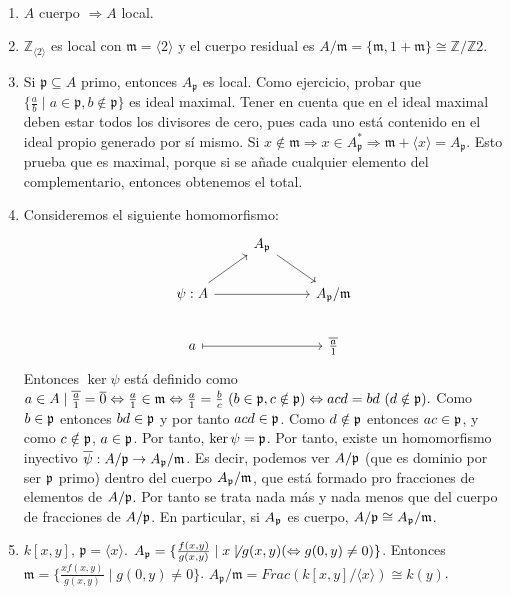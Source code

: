 \documentclass[ACGA.tex]{subfiles}
\begin{document}
\begin{ej}\
\begin{enumerate}
\item $A$ cuerpo $\Rightarrow A$ local. 
\item $\mathbb{Z}_{\langle 2\rangle}$ es local con $\mathfrak{m}=\langle 2\rangle$ y el cuerpo residual es $A/\mathfrak{m}=\{\mathfrak{m},1+\mathfrak{m}\}\cong\mathbb{Z}/\mathbb{Z}2$.
\item Si $\mathfrak{p}\subseteq A$ primo, entonces $A_{\mathfrak{p}}$ es local. Como ejercicio, probar que $\{\frac{a}{b}\mid a\in\mathfrak{p},b\notin\mathfrak{p}\}$ es ideal maximal. Tener en cuenta que en el ideal maximal deben estar todos los divisores de cero, pues cada uno está contenido en el ideal propio generado por sí mismo. Si $x\notin\mathfrak{m}\Rightarrow x\in A_\mathfrak{p}^*\Rightarrow \mathfrak{m}+\langle x\rangle =A_\mathfrak{p}$. Esto prueba que es maximal, porque si se añade cualquier elemento del complementario, entonces obtenemos el total.
\item Consideremos el siguiente homomorfismo:
\[
\begin{tikzcd}
& A_\p  \arrow[dr] & \\
\psi:A \arrow[ur]\arrow{rr} & & A_\p/\m\\
     a\arrow[rr, mapsto] & & \overline{\frac{a}{1}}
\end{tikzcd}
\]
Entonces $\ker{\psi}$ está definido como $a\in A\mid \overline{\frac{a}{1}}=\overline{0}\Leftrightarrow \frac{a}{1}\in{\mathfrak{m}}\Leftrightarrow\frac{a}{1}=\frac{b}{c}\ (b\in{\mathfrak{p}}, c\notin{\mathfrak{p}})\Leftrightarrow acd=bd\ (d\notin {\mathfrak{p}}).$ Como $b\in{\mathfrak{p}}$ entonces $bd\in{\mathfrak{p}}$ y por tanto $acd\in{\mathfrak{p}}$. Como $d\notin{\mathfrak{p}}$ entonces $ac\in{\mathfrak{p}}$, y como $c\notin{\mathfrak{p}}$, $a\in{\mathfrak{p}}$. Por tanto, $\ker{\psi}={\mathfrak{p}}$. Por tanto, existe un homomorfismo inyectivo $\overline{\psi}:A/{\mathfrak{p}}\to A_{\mathfrak{p}}/{\mathfrak{m}}$. Es decir, podemos ver $A/{\mathfrak{p}}$ (que es dominio por ser ${\mathfrak{p}}$ primo) dentro del cuerpo $A_{\mathfrak{p}}/{\mathfrak{m}}$, que está formado pro fracciones de elementos de $A/{\mathfrak{p}}$. Por tanto se trata nada más y nada menos que del cuerpo de fracciones de $A/{\mathfrak{p}}$. En particular, si $A_{\mathfrak{p}}$ es cuerpo, $A/{\mathfrak{p}}\cong A_{\mathfrak{p}}/{\mathfrak{m}}$.
\item $k[x,y]$, $\mathfrak{p}=\langle x\rangle$. $A_\mathfrak{p}=\{\frac{f(x,y)}{g(x,y)}\mid x\not\mid g(x,y)(\Leftrightarrow g(0,y)\neq 0)\}$. Entonces $\mathfrak{m}=\{\frac{xf(x,y)}{g(x,y)}\mid g(0,y)\neq 0\}$. $A_\mathfrak{p}/\mathfrak{m}=Frac(k[x,y]/\langle x\rangle) \cong k(y)$. 
\end{enumerate}
\end{ej}
\end{document}
